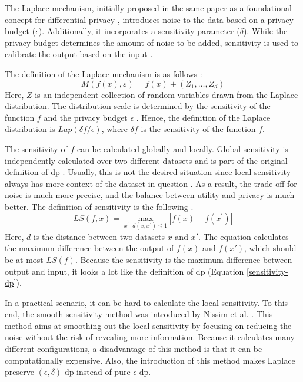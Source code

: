The Laplace mechanism, initially proposed in the same paper as a foundational concept for differential privacy \citep{dwork_differential_2006},
introduces noise to the data based on a privacy budget ($\epsilon$).
Additionally, it incorporates a sensitivity parameter ($\delta$).
While the privacy budget determines the amount of noise to be added, sensitivity is used to calibrate the output based on the input \citep{del_rey_comprehensive_2020}.

The definition of the Laplace mechanism is as follows \citep{del_rey_comprehensive_2020}:
\begin{equation}
  M\left(f\left(x\right),\varepsilon\right)=f\left(x\right)+\left(Z_{1},\ldots,Z_{d}\right)
\end{equation}
Here, $Z$ is an independent collection of random variables drawn from the Laplace distribution.
The distribution scale is determined by the sensitivity of the function $f$ and the privacy budget $\epsilon$ \citep{del_rey_comprehensive_2020}.
Hence, the definition of the Laplace distribution is $Lap(\delta f/\epsilon)$, where $\delta f$ is the sensitivity of the function $f$. \newline

The sensitivity of $f$ can be calculated globally and locally.
Global sensitivity is independently calculated over two different datasets and is part of the original definition of \gls{dp} \citep{dwork_differential_2006}.
Usually, this is not the desired situation since local sensitivity always has more context of the dataset in question \citep{nissim_smooth_2007}.
As a result, the trade-off for noise is much more precise, and the balance between utility and privacy is much better.
The definition of sensitivity is the following \citep{nissim_smooth_2007}.
\begin{equation}
  LS(f,x)=\operatorname*{max}_{x^{\prime}\cdot d(x,x^{\prime})\leq1}|f(x)-f(x^{\prime})|
  \label{local-sensitivity}
\end{equation}
Here, $d$ is the distance between two datasets $x$ and $x'$.
The equation calculates the maximum difference between the output of $f(x)$ and $f(x')$, which should be at most $LS(f)$.
Because the sensitivity is the maximum difference between output and input, it looks a lot like the definition of \gls{dp} (Equation \ref{sensitivity-dp}).

In a practical scenario, it can be hard to calculate the local sensitivity.
To this end, the smooth sensitivity method was introduced by Nissim et al.  \citep{nissim_smooth_2007}.
This method aims at smoothing out the local sensitivity by focusing on reducing the noise without the risk of revealing more information.
Because it calculates many different configurations, a disadvantage of this method is that it can be computationally expensive.
Also, the introduction of this method makes Laplace preserve $(\epsilon, \delta)$-\gls{dp} instead of pure $\epsilon$-\gls{dp}.

